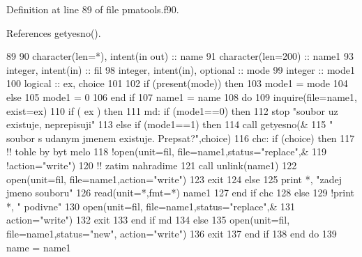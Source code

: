 Definition at line 89 of file pmatools.\+f90.



References getyesno().


\begin{DoxyCode}
89 
90         \textcolor{keywordtype}{character(len=*)}, \textcolor{keywordtype}{intent(in out)}  :: name
91         \textcolor{keywordtype}{character(len=200)}            :: name1
93         \textcolor{keywordtype}{integer}, \textcolor{keywordtype}{intent(in)} :: fil
98         \textcolor{keywordtype}{integer}, \textcolor{keywordtype}{intent(in)}, \textcolor{keywordtype}{optional}  :: mode
99         \textcolor{keywordtype}{integer} :: mode1
100         \textcolor{keywordtype}{logical} :: ex, choice
101 
102         \textcolor{keywordflow}{if} (\textcolor{keyword}{present}(mode)) then
103         mode1 = mode
104         else
105             mode1 = 0
106 \textcolor{keyword}{        end }if
107         name1 = name
108         do
109             \textcolor{keyword}{inquire}(file=name1, exist=ex)
110             \textcolor{keywordflow}{if} ( ex ) then
111                 md: \textcolor{keywordflow}{if} (mode1==0) then
112                 stop \textcolor{stringliteral}{"soubor uz existuje, neprepisuji"}
113                 \textcolor{keywordflow}{else} \textcolor{keywordflow}{if} (mode1==1) then
114                     \textcolor{keyword}{call }getyesno(&
115                     \textcolor{stringliteral}{" soubor s udanym jmenem existuje. Prepsat?"},choice)
116                     chc: \textcolor{keywordflow}{if} (choice) then
117                         \textcolor{comment}{!! tohle by byt melo
}
118                         \textcolor{comment}{!open(unit=fil, file=name1,status="replace",&
}
119                         \textcolor{comment}{!action="write")
}
120                         \textcolor{comment}{!! zatim  nahradime
}
121                         \textcolor{keyword}{call }unlink(name1)
122                         \textcolor{keyword}{open}(unit=fil, file=name1,action=\textcolor{stringliteral}{"write"})
123                     exit
124                     else
125                         print *, \textcolor{stringliteral}{"zadej jmeno souboru"}
126                         \textcolor{keyword}{read}(unit=*,fmt=*) name1
127 \textcolor{keywordflow}{                    end if} chc
128                 else
129                     \textcolor{comment}{!print *, " podivne"
}
130                     \textcolor{keyword}{open}(unit=fil, file=name1,status=\textcolor{stringliteral}{"replace"},&
131                     action=\textcolor{stringliteral}{"write"})
132                     exit
133 \textcolor{keywordflow}{                end if} md
134             else
135                 \textcolor{keyword}{open}(unit=fil, file=name1,status=\textcolor{stringliteral}{"new"}, action=\textcolor{stringliteral}{"write"})
136                 exit
137 \textcolor{keyword}{            end }if
138 \textcolor{keyword}{        end }do
139         name = name1
\end{DoxyCode}


